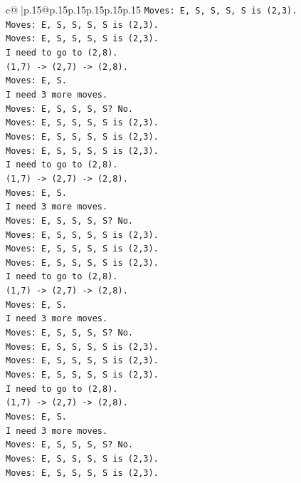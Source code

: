\documentclass{article}
\begin{document}
{\begin{supertabular}{c@{$\;$}|p{.15\linewidth}@{}p{.15\linewidth}p{.15\linewidth}p{.15\linewidth}p{.15\linewidth}p{.15\linewidth}}
{{{\texttt{Moves: E, S, S, S, S is (2,3).} \\
\texttt{Moves: E, S, S, S, S is (2,3).} \\
\texttt{Moves: E, S, S, S, S is (2,3).} \\
\texttt{I need to go to (2,8).} \\
\texttt{(1,7) {-}> (2,7) {-}> (2,8).} \\
\texttt{Moves: E, S.} \\
\texttt{I need 3 more moves.} \\
\texttt{Moves: E, S, S, S, S? No.} \\
\texttt{Moves: E, S, S, S, S is (2,3).} \\
\texttt{Moves: E, S, S, S, S is (2,3).} \\
\texttt{Moves: E, S, S, S, S is (2,3).} \\
\texttt{I need to go to (2,8).} \\
\texttt{(1,7) {-}> (2,7) {-}> (2,8).} \\
\texttt{Moves: E, S.} \\
\texttt{I need 3 more moves.} \\
\texttt{Moves: E, S, S, S, S? No.} \\
\texttt{Moves: E, S, S, S, S is (2,3).} \\
\texttt{Moves: E, S, S, S, S is (2,3).} \\
\texttt{Moves: E, S, S, S, S is (2,3).} \\
\texttt{I need to go to (2,8).} \\
\texttt{(1,7) {-}> (2,7) {-}> (2,8).} \\
\texttt{Moves: E, S.} \\
\texttt{I need 3 more moves.} \\
\texttt{Moves: E, S, S, S, S? No.} \\
\texttt{Moves: E, S, S, S, S is (2,3).} \\
\texttt{Moves: E, S, S, S, S is (2,3).} \\
\texttt{Moves: E, S, S, S, S is (2,3).} \\
\texttt{I need to go to (2,8).} \\
\texttt{(1,7) {-}> (2,7) {-}> (2,8).} \\
\texttt{Moves: E, S.} \\
\texttt{I need 3 more moves.} \\
\texttt{Moves: E, S, S, S, S? No.} \\
\texttt{Moves: E, S, S, S, S is (2,3).} \\
\texttt{Moves: E, S, S, S, S is (2,3).} \\
}}}
\end{supertabular}}
\end{document}
